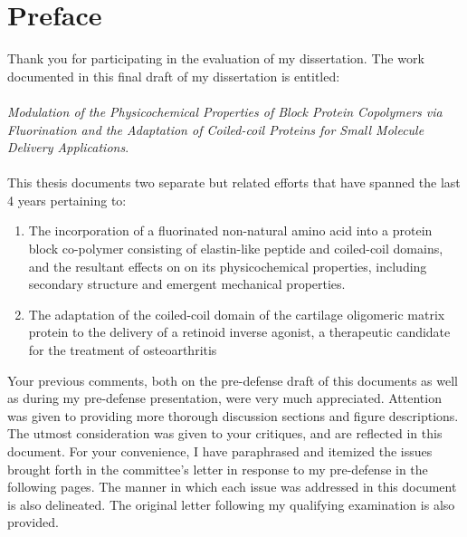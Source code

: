 \section*{Preface}
Thank you for participating in the evaluation of my dissertation. The work
documented in this final draft of my dissertation is entitled:
\hspace{0pt}\\
\hspace{0pt}\\
\emph{Modulation of the Physicochemical Properties of Block Protein Copolymers
via Fluorination and the Adaptation of Coiled-coil Proteins for Small Molecule
Delivery Applications}.
\hspace{0pt}\\
\hspace{0pt}\\
This thesis documents two separate but related efforts that have spanned the
last 4 years pertaining to:
   
\begin{enumerate}

    \item The incorporation of a fluorinated non-natural amino acid into a
        protein block co-polymer consisting of elastin-like peptide and
        coiled-coil domains, and the resultant effects on on its physicochemical
        properties, including secondary structure and emergent mechanical
        properties.

    \item The adaptation of the coiled-coil domain of the cartilage oligomeric
        matrix protein to the delivery of a retinoid inverse agonist, a
        therapeutic candidate for the treatment of osteoarthritis

\end{enumerate}

Your previous comments, both on the pre-defense draft of this documents as well
as during my pre-defense presentation, were very much appreciated. Attention was
given to providing more thorough discussion sections and figure descriptions.
The utmost consideration was given to your critiques, and are reflected in this
document.  For your convenience, I have paraphrased and itemized the issues
brought forth in the committee's letter in response to my pre-defense in the
following pages.  The manner in which each issue was addressed in this document
is also delineated. The original letter following my qualifying examination is
also provided.

